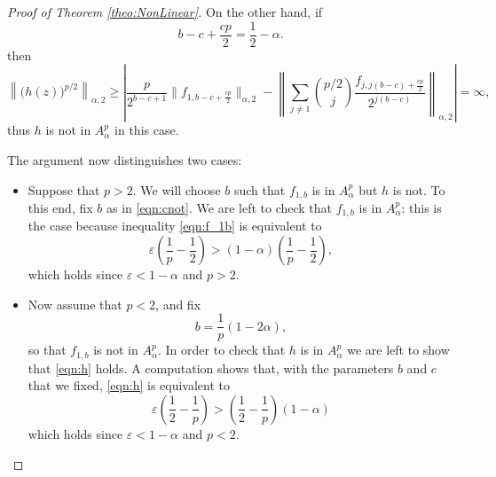 \documentclass[10pt,a4paper]{amsart}
\begin{document}
\begin{proof}[Proof of Theorem \ref{theo:NonLinear}]
            On the other hand, if 
                \begin{equation}
                \label{eqn:cnot}
                    b-c+\frac{cp}{2}=\frac{1}{2}-\alpha.
                \end{equation}
                then
                \[
                    \left\|\big(h(z)\big)^{p/2}\right\|_{\alpha, 2}\ge\left| \frac{p}{2^{b-c+1}}\|f_{1, b-c+\frac{cp}{2}}\|_{\alpha, 2}- \left \| \sum_{j \ne1} \binom{p/2}{j} \frac{f_{j,j(b-c) + \frac{cp}{2}}}{2^{j(b-c)}} \right \|_{\alpha, 2} \right|=\infty,
                \]
                thus $h$ is not in $A^p_\alpha$ in this case.
        
            The argument now distinguishes two cases:
                \begin{itemize}
                
                    \item Suppose that $p>2$. We will choose $b$ such that $f_{1, b}$ is in $A^p_\alpha$ but $h$ is not. To this end, fix $b$ as in \eqref{eqn:cnot}. We are left to check that $f_{1, b}$ is in $A^p_\alpha$: this is the case because inequality \eqref{eqn:f_1b} is equivalent to 
                     \[
                     \varepsilon\left(\frac{1}{p}-\frac{1}{2}\right)>(1-\alpha)\left(\frac{1}{p}-\frac{1}{2}\right),
                     \]
                    which holds since $\varepsilon<1-\alpha$ and $p>2$.
                     
                    \item Now assume that $p<2$, and fix 
                    \[
                    b=\frac{1}{p}(1-2\alpha),
                    \]
                    so that $f_{1, b}$ is not in $A^p_\alpha$. In order to check that $h$ is in $A^p_\alpha$ we are left to show that \eqref{eqn:h} holds. A computation shows that, with the parameters $b$ and $c$ that we fixed, \eqref{eqn:h} is equivalent to 
                    \[
                    \varepsilon\left(\frac{1}{2}-\frac{1}{p}\right)>\left(\frac{1}{2}-\frac{1}{p}\right)(1-\alpha)
                    \]
                    which holds since $\varepsilon<1-\alpha$ and $p<2$.
                \end{itemize}
        \end{proof}
\end{document}
